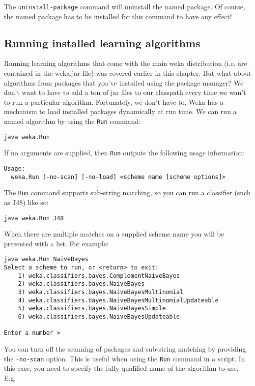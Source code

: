The \texttt{uninstall-package} command will uninstall the named package. Of course,
the named package has to be installed for this command to have any effect!

\subsection{Running installed learning algorithms}

Running learning algorithms that come with the main weka distribution
(i.e. are contained in the weka.jar file) was covered earlier in this
chapter. But what about algorithms from packages that you've installed
using the package manager? We don't want to have to add a ton of jar
files to our classpath every time we wan't to run a particular
algorithm. Fortunately, we don't have to. Weka has a mechanism to
load installed packages dynamically at run time. We can run a named
algorithm by using the \texttt{Run} command:

\texttt{java weka.Run}

If no arguments are supplied, then \texttt{Run} outputs the following usage
information:

{\scriptsize
\begin{verbatim}
Usage:
  weka.Run [-no-scan] [-no-load] <scheme name [scheme options]>
\end{verbatim}}

The \texttt{Run} command supports sub-string matching, so you can run
a classifier (such as J48) like so:

{\scriptsize
\begin{verbatim}
java weka.Run J48
\end{verbatim}}

When there are multiple matches on a supplied scheme name you will be presented with
a list. For example:

{\scriptsize
\begin{verbatim}
java weka.Run NaiveBayes
Select a scheme to run, or <return> to exit:
    1) weka.classifiers.bayes.ComplementNaiveBayes
    2) weka.classifiers.bayes.NaiveBayes
    3) weka.classifiers.bayes.NaiveBayesMultinomial
    4) weka.classifiers.bayes.NaiveBayesMultinomialUpdateable
    5) weka.classifiers.bayes.NaiveBayesSimple
    6) weka.classifiers.bayes.NaiveBayesUpdateable

Enter a number >
\end{verbatim}}

You can turn off the scanning of packages and sub-string matching by
providing the \texttt{-no-scan} option. This is useful when using the
\texttt{Run} command in a script. In this case, you need to specify
the fully qualified name of the algorithm to use. E.g.

